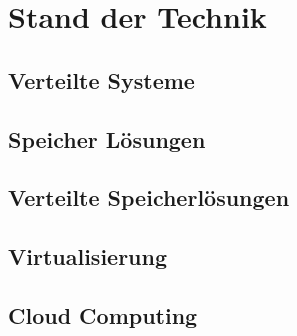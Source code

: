 \chapter{Stand der Technik}\label{ch:background}

\section{Verteilte Systeme}

\section{Speicher Lösungen}


\section{Verteilte Speicherlösungen}


\section{Virtualisierung}

\section{Cloud Computing}
